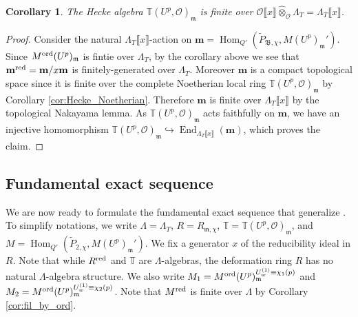 \documentclass[leqno]{amsart}
\newtheorem{cor}[thm]{Corollary}
\theoremstyle{definition}
\theoremstyle{remark}
\newcommand{\oo}{\mathcal{O}}
\DeclareMathOperator{\End}{End}
\DeclareMathOperator{\Hom}{Hom}
\newcommand{\fm}{\mathfrak{m}}
\newcommand{\B}{\mathfrak B} %
\newcommand{\red}{\textnormal{red}}
\newcommand{\TT}{\mathbb{T}} %
\newcommand{\ord}{\textnormal{ord}} %
\begin{document}
\begin{cor}\label{cor:Hecke_finite}
The Hecke algebra 
$\TT(U^p,\oo)_{\fm}$ 
is finite over
$\oo\llbracket x\rrbracket \hat{\otimes}_{\oo}\Lambda_T
=\Lambda_T\llbracket x\rrbracket$.
\end{cor}
\begin{proof}
	Consider the natural
	$\Lambda_T\llbracket x\rrbracket$-action on
	$\mathbf{m}=\Hom_{Q'}(\tilde{P}_{\B,\chi},
	M(U^p)_{\fm}')$.
	Since $M^{\ord}(U^p)_{\fm}$ 
	is fintie over $\Lambda_T$,
	by the corollary above 
	we see that 
	$\mathbf{m}^{\red}=\mathbf{m}/x\mathbf{m}$ 
	is finitely-generated over $\Lambda_T$.
	Moreover $\mathbf{m}$ is a compact 
	topological space 
	since it is finite over  
	the complete Noetherian local ring 
	$\TT(U^p,\oo)_{\fm}$ 
	by Corollary \ref{cor:Hecke_Noetherian}.
	Therefore $\mathbf{m}$
	is finite over $\Lambda_T\llbracket x\rrbracket$
	by the topological Nakayama lemma.
	As $\TT(U^p,\oo)_{\fm}$ acts faithfully
	on $\mathbf{m}$,
	we have an injective homomorphism
	$\TT(U^p,\oo)_{\fm}\hookrightarrow 
	\End_{\Lambda_T\llbracket x\rrbracket}(\mathbf{m})$,
	which proves the claim.
\end{proof}


\subsection{Fundamental exact sequence}
\label{sub:fund_exact_sequence}

We are now ready to 
formulate the fundamental
exact sequence 
that generalize \cite[Prop 6.3.5]{urban}.
To simplify notations,
we write 
$\Lambda=\Lambda_T$,
$R=R_{\fm,\chi}$,
$\TT=\TT(U^p,\oo)_{\fm}$, and
$M=\Hom_{Q'}(\tilde{P}_{2,\chi},M(U^p)_{\fm}')$.
We fix a generator $x$ of the reducibility
ideal in $R$.
Note that 
while $R^{\red}$ and $\TT$
are  $\Lambda$-algebras,
the deformation ring $R$ 
has no natural $\Lambda$-algebra structure.
We also write
$M_1=M^{\ord}(U^p)_{\fm}^{U_{w}^{(1)}\equiv \chi_1(p)}$
and
$M_2=M^{\ord}(U^p)_{\fm}^{U_{w}^{(1)}\equiv \chi_2(p)}$.
Note that $M^{\red}$ is finite over $\Lambda$
by Corollary \ref{cor:fil_by_ord}.
\end{document}
